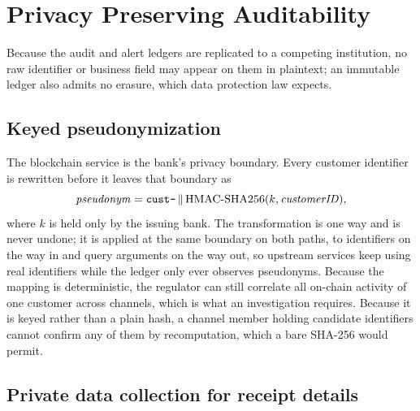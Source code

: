 \documentclass[conference]{IEEEtran}
\begin{document}
\section{Privacy Preserving Auditability}
\label{sec:privacy}

Because the audit and alert ledgers are replicated to a competing institution,
no raw identifier or business field may appear on them in plaintext; an
immutable ledger also admits no erasure, which data protection law expects.

\subsection{Keyed pseudonymization}

The blockchain service is the bank's privacy boundary. Every customer identifier
is rewritten before it leaves that boundary as
\begin{equation}
\mathit{pseudonym} = \text{\texttt{cust-}} \,\|\,
\mathrm{HMAC\text{-}SHA256}(k, \mathit{customerID}),
\label{eq:pseudonym}
\end{equation}
where $k$ is held only by the issuing bank. The transformation is one way and is
never undone; it is applied at the same boundary on both paths, to identifiers
on the way in and query arguments on the way out, so upstream services keep
using real identifiers while the ledger only ever observes pseudonyms. Because
the mapping is deterministic, the regulator can still correlate all on-chain
activity of one customer across channels, which is what an investigation
requires. Because it is keyed rather than a plain hash, a channel member holding
candidate identifiers cannot confirm any of them by recomputation, which a bare
SHA-256 would permit.

\subsection{Private data collection for receipt details}
\end{document}
